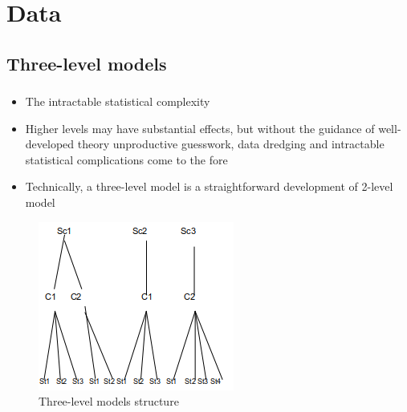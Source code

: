 \documentclass[c, dvipsnames]{beamer}  %
\begin{document}
\section{Data} 

\subsection{Three-level models} 


\begin{frame}[shrink=5]
\frametitle{\insertsection} 
\framesubtitle{\insertsubsection}

\begin{itemize}
	\item  The intractable statistical complexity 
	\item  Higher levels may have substantial effects, but without the guidance of well-developed theory  unproductive guesswork, data dredging and intractable statistical complications come to the fore
	\item Technically, a three-level model is a straightforward development of 2-level model
\end{itemize}




\begin{figure}
	\centering
	\includegraphics[width=0.4\linewidth]{screenshot001}
	\caption{Three-level models structure}
	\label{fig:screenshot001}
\end{figure}


\end{frame}
\end{document}
